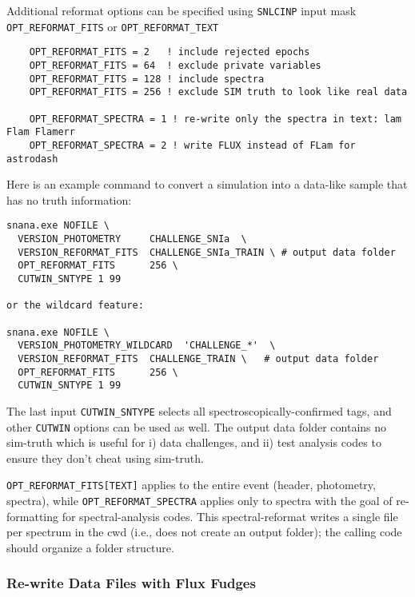 \documentclass[12pt]{article}
\begin{document}
\medskip
Additional reformat options can be specified using {\tt SNLCINP} input mask
{\tt OPT\_REFORMAT\_FITS} or {\tt OPT\_REFORMAT\_TEXT}
\begin{verbatim}  
    OPT_REFORMAT_FITS = 2   ! include rejected epochs
    OPT_REFORMAT_FITS = 64  ! exclude private variables
    OPT_REFORMAT_FITS = 128 ! include spectra
    OPT_REFORMAT_FITS = 256 ! exclude SIM truth to look like real data

    OPT_REFORMAT_SPECTRA = 1 ! re-write only the spectra in text: lam Flam Flamerr
    OPT_REFORMAT_SPECTRA = 2 ! write FLUX instead of FLam for astrodash
\end{verbatim}
%
Here is an example command to convert a simulation into a data-like
sample that has no truth information:
\begin{verbatim}    
snana.exe NOFILE \
  VERSION_PHOTOMETRY     CHALLENGE_SNIa  \
  VERSION_REFORMAT_FITS  CHALLENGE_SNIa_TRAIN \ # output data folder
  OPT_REFORMAT_FITS      256 \
  CUTWIN_SNTYPE 1 99

or the wildcard feature:

snana.exe NOFILE \
  VERSION_PHOTOMETRY_WILDCARD  'CHALLENGE_*'  \
  VERSION_REFORMAT_FITS  CHALLENGE_TRAIN \   # output data folder
  OPT_REFORMAT_FITS      256 \
  CUTWIN_SNTYPE 1 99

\end{verbatim}     
%
The last input {\tt CUTWIN\_SNTYPE} selects all 
spectroscopically-confirmed tags, and other {\tt CUTWIN} 
options can be used as well. 
The output data folder contains no sim-truth which
is useful for i) data challenges, and ii) test analysis codes
to ensure they don't cheat using sim-truth.

{\tt OPT\_REFORMAT\_FITS[TEXT]} applies to the entire event (header, photometry, spectra),
while {\tt OPT\_REFORMAT\_SPECTRA} applies only to spectra with the goal of re-formatting
for spectral-analysis codes. This spectral-reformat writes a single file per spectrum in 
the cwd (i.e., does not create an output folder); the calling code should organize
a folder structure.

  \clearpage
  \subsubsection{Re-write Data Files with Flux Fudges}
  \label{sss:text2text}
\end{document}
